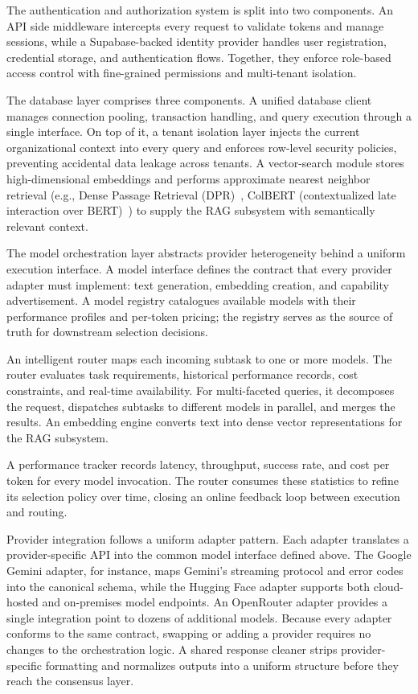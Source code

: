\documentclass{iopjournal}
\begin{document}
The authentication and authorization system is split into two components. An API side middleware intercepts every request to validate tokens and manage sessions, while a Supabase-backed identity provider handles user registration, credential storage, and authentication flows. Together, they enforce role-based access control with fine-grained permissions and multi-tenant isolation.

The database layer comprises three components. A unified database client manages connection pooling, transaction handling, and query execution through a single interface. On top of it, a tenant isolation layer injects the current organizational context into every query and enforces row-level security policies, preventing accidental data leakage across tenants. A vector-search module stores high-dimensional embeddings and performs approximate nearest neighbor retrieval (e.g., Dense Passage Retrieval (DPR)~\cite{DPR}, ColBERT (contextualized late interaction over BERT)~\cite{ColBERT}) to supply the RAG subsystem with semantically relevant context.

The model orchestration layer abstracts provider heterogeneity behind a uniform execution interface. A model interface defines the contract that every provider adapter must implement: text generation, embedding creation, and capability advertisement. A model registry catalogues available models with their performance profiles and per-token pricing; the registry serves as the source of truth for downstream selection decisions.

An intelligent router maps each incoming subtask to one or more models. The router evaluates task requirements, historical performance records, cost constraints, and real-time availability. For multi-faceted queries, it decomposes the request, dispatches subtasks to different models in parallel, and merges the results. An embedding engine converts text into dense vector representations for the RAG subsystem.

A performance tracker records latency, throughput, success rate, and cost per token for every model invocation. The router consumes these statistics to refine its selection policy over time, closing an online feedback loop between execution and routing.

Provider integration follows a uniform adapter pattern. Each adapter translates a provider-specific API into the common model interface defined above. The Google Gemini adapter, for instance, maps Gemini's streaming protocol and error codes into the canonical schema, while the Hugging Face adapter supports both cloud-hosted and on-premises model endpoints. An OpenRouter adapter provides a single integration point to dozens of additional models. Because every adapter conforms to the same contract, swapping or adding a provider requires no changes to the orchestration logic. A shared response cleaner strips provider-specific formatting and normalizes outputs into a uniform structure before they reach the consensus layer.
\end{document}
